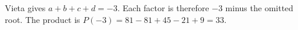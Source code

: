 Vieta gives $a+b+c+d=-3$. Each factor is therefore $-3$ minus the omitted root. The product is $P(-3)=81-81+45-21+9=\boxed{33}$.
